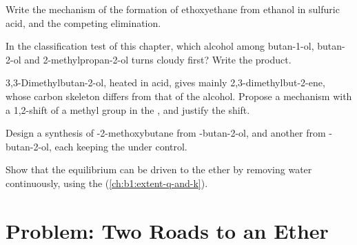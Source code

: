\begin{exercise}[$\star\star$]\label{exo:b1:alcohol-activation:8}
Write the mechanism of the formation of ethoxyethane from ethanol in
sulfuric acid, and the competing elimination.
\end{exercise}

\begin{exercise}[$\star\star$]\label{exo:b1:alcohol-activation:9}
In the classification test of this chapter, which alcohol among
butan-1-ol, butan-2-ol and 2-methylpropan-2-ol turns cloudy first? Write
the product.
\end{exercise}

\begin{exercise}[$\star\star\star$]\label{exo:b1:alcohol-activation:10}
3,3-Dimethylbutan-2-ol, heated in acid, gives mainly
2,3-dimethylbut-2-ene, whose carbon skeleton differs from that of the
alcohol. Propose a mechanism with a 1,2-shift of a methyl group in the
, and justify the shift.
\end{exercise}

\begin{exercise}[$\star\star\star$]\label{exo:b1:alcohol-activation:11}
Design a synthesis of -2-methoxybutane from -butan-2-ol,
and another from -butan-2-ol, each keeping the  under
control.
\end{exercise}

\begin{exercise}[$\star\star\star$]\label{exo:b1:alcohol-activation:12}
Show that the equilibrium  can be
driven to the ether by removing water continuously, using the  (\cref{ch:b1:extent-q-and-k}).
\end{exercise}

\section{Problem: Two Roads to an Ether}

